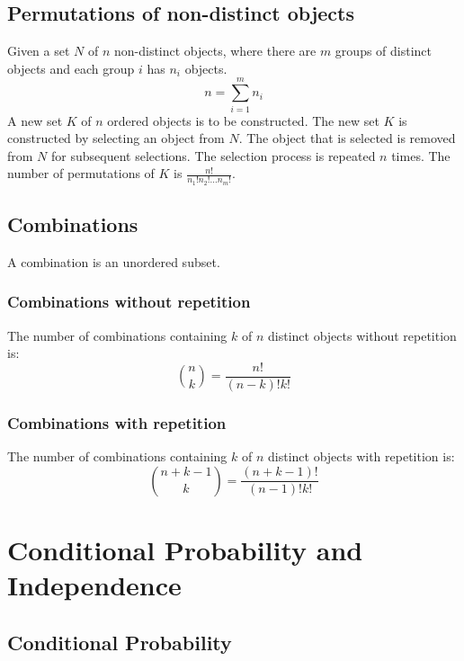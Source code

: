 \documentclass{article}
\begin{document}
\subsection{Permutations of non-distinct objects}

Given a set $N$ of $n$ non-distinct objects, where there are $m$ groups of distinct objects and each group $i$ has $n_i$ objects.
\[n=\sum_{i=1}^m n_i\]
A new set $K$ of $n$ ordered objects is to be constructed. The new set $K$ is constructed by selecting an object from $N$. The object that is selected is removed from $N$ for subsequent selections. The selection process is repeated $n$ times. The number of permutations of $K$ is $\frac{n!}{n_1!n_2!...n_m!}$.

\subsection{Combinations}

A combination is an unordered subset.

\subsubsection{Combinations without repetition}

The number of combinations containing $k$ of $n$ distinct objects without repetition is:
\[\binom{n}{k}=\frac{n!}{(n-k)!k!}\]

\subsubsection{Combinations with repetition}

The number of combinations containing $k$ of $n$ distinct objects with repetition is:
\[\binom{n+k-1}{k}=\frac{(n+k-1)!}{(n-1)!k!}\]

\newpage
\section{Conditional Probability and Independence}

\subsection{Conditional Probability}
\end{document}
